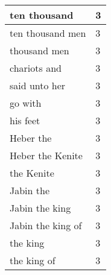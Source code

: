\begin{center}
\begin{longtable}{|p{3.0in}|p{0.5in}|}
ten thousand & 3\\ \hline 
ten thousand men & 3\\ \hline 
thousand men & 3\\ \hline 
chariots and & 3\\ \hline 
said unto her & 3\\ \hline 
go with & 3\\ \hline 
his feet & 3\\ \hline 
Heber the & 3\\ \hline 
Heber the Kenite & 3\\ \hline 
the Kenite & 3\\ \hline 
Jabin the & 3\\ \hline 
Jabin the king & 3\\ \hline 
Jabin the king of & 3\\ \hline 
the king & 3\\ \hline 
the king of & 3\\ \hline 
\end{longtable}
\end{center}





